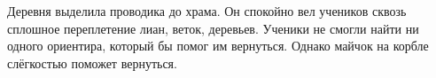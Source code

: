 Деревня выделила проводика до храма. Он спокойно вел учеников сквозь сплошное переплетение лиан, веток, деревьев. Ученики не смогли найти ни одного ориентира, который бы помог им вернуться. Однако майчок на корбле слёгкостью поможет вернуться.